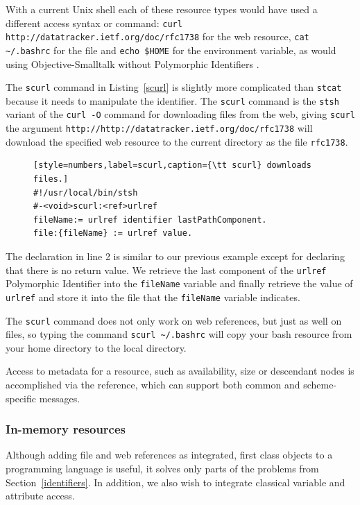 \documentclass{acm_proc_article-sp}
\begin{document}
With a current Unix shell each of these resource types would have used a different
access syntax or command:   {\tt curl http://datatracker.ietf.org/doc/rfc1738} for the
web resource, {\tt cat  \~\//.bashrc} for the file and {\tt echo \$HOME} for the environment
variable, as would using Objective-Smalltalk without Polymorphic Identifiers .

The {\tt scurl} command in Listing~\ref{scurl} is slightly more complicated than {\tt stcat} because
it needs to manipulate the identifier.  The {\tt scurl} command
is the {\tt stsh} variant of the {\tt curl -O} command for downloading files from the web, giving 
{\tt scurl} the argument {\tt http://http://datatracker.ietf.org/doc/rfc1738} will download the specified web resource
to the current directory as the file {\tt rfc1738}.


\begin{figure}[htbp]
\begin{lstlisting}[style=numbers,label=scurl,caption={\tt scurl} downloads files.]
#!/usr/local/bin/stsh
#-<void>scurl:<ref>urlref
fileName:= urlref identifier lastPathComponent.
file:{fileName} := urlref value.
\end{lstlisting}
\end{figure}


The declaration in line 2 is similar to our previous example except for declaring that there
is no return value.   We retrieve the last component of the {\tt urlref} Polymorphic Identifier into the {\tt fileName}
variable and finally retrieve the value of  {\tt urlref} and store it into the file that
the {\tt fileName} variable indicates.

The {\tt scurl} command does not only work on web references, but just as well
on files, so typing the command {\tt scurl \~\//.bashrc} will copy your bash resource from your home directory
to the local directory.

Access to metadata for a resource, such as availability, size or descendant nodes
is accomplished via the reference, which can support both common and scheme-specific
messages.

\subsubsection{In-memory resources}
\label{inmemory}

Although adding file and web references as integrated, first class objects to a programming
language is useful, it solves only parts of the problems from Section~\ref{identifiers}.
In addition, we also wish to integrate classical variable and attribute access.
\end{document}

